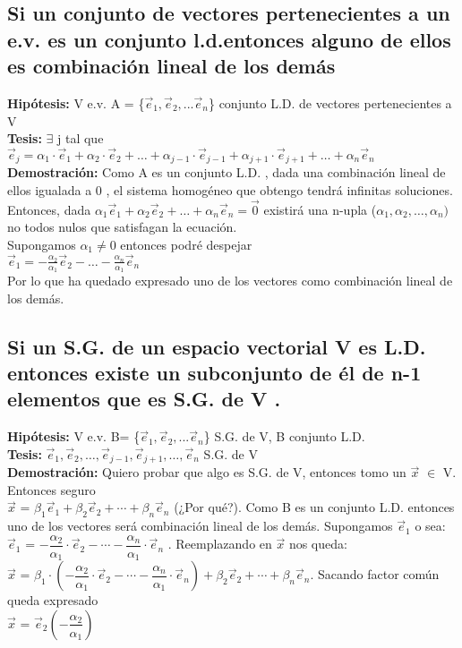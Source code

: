 \documentclass[11pt]{article}
\begin{document}
\subsection{Si un conjunto de vectores pertenecientes a un e.v. es un conjunto l.d.entonces alguno de ellos es combinación lineal de los demás }
{\bfseries {Hipótesis:}} V e.v. A = \{$\vec{e}_{1}, \vec{e}_2,... \vec{e}_n $\} conjunto L.D. de vectores pertenecientes a V \\
{\bfseries {Tesis:}} $\exists$ j tal que $\vec{e}_j = \alpha_1\cdot\vec{e}_1 + \alpha_2\cdot\vec{e}_2 + \hdots + \alpha_{j-1}\cdot\vec{e}_{j-1} + \alpha_{j+1}\cdot\vec{e}_{j+1} + \hdots + \alpha_n\vec{e}_n$\\
{\bfseries Demostración:} Como A es un conjunto L.D. , dada una combinación lineal de ellos igualada a 0  , el sistema homogéneo que obtengo tendrá infinitas soluciones. \\
Entonces, dada $\alpha_1\vec{e}_1+\alpha_2\vec{e}_2+\hdots+\alpha_n\vec{e}_{n} = \vec{0}$ existirá una n-upla ($\alpha_1,\alpha_2,\hdots,\alpha_n)$ no todos nulos que satisfagan la ecuación.\\
Supongamos $\alpha_1 \neq 0$ entonces podré despejar \\
$\vec{e}_1 = -\frac{\alpha_2}{\alpha_1} \vec{e}_2 - \hdots - \frac{\alpha_n}{\alpha_1}\vec{e}_n$\\
Por lo que ha quedado expresado uno de los vectores como combinación lineal de los demás. 
\subsection{Si un S.G. de un espacio vectorial V es L.D. entonces existe un subconjunto de él de n-1 elementos que es S.G. de V .}
{\bfseries {Hipótesis:}} V e.v. B= \{$\vec{e}_{1}, \vec{e}_2,... \vec{e}_n $\} S.G. de V, B conjunto L.D. \\
{\bfseries {Tesis:}} $\vec{e}_1 , \vec{e}_2 , \hdots , \vec{e}_{j-1} , \vec{e}_{j+1} , \hdots , \vec{e}_n$ S.G. de V\\
{\bfseries Demostración:} Quiero probar que algo es S.G. de V, entonces tomo un $\vec{x}$ $\in$ V. Entonces seguro\\ $\vec{x}$ = $\beta_1\vec{e}_1+\beta_2\vec{e}_2+\cdots+\beta_n\vec{e}_n$ (¿Por qué?). Como B es un conjunto L.D. entonces uno de los vectores será combinación lineal de los demás. Supongamos $\vec{e}_1$ o sea: \\
$\vec{e}_1$ = $-\dfrac{\alpha_2}{\alpha_1}\cdot\vec{e}_2 - \cdots - \dfrac{\alpha_n}{\alpha_1}\cdot\vec{e}_n$ . Reemplazando en $\vec{x}$ nos queda: \\
$\vec{x}$ = $\beta_1 \cdot (-\dfrac{\alpha_2}{\alpha_1}\cdot\vec{e}_2 - \cdots - \dfrac{\alpha_n}{\alpha_1}\cdot\vec{e}_n)+\beta_2\vec{e}_2+\cdots+\beta_n\vec{e}_n $. Sacando factor común queda expresado\\ $\vec{x}$ = $\vec{e}_2(- \dfrac{\alpha_2}{\alpha_1})$  
\end{document}
